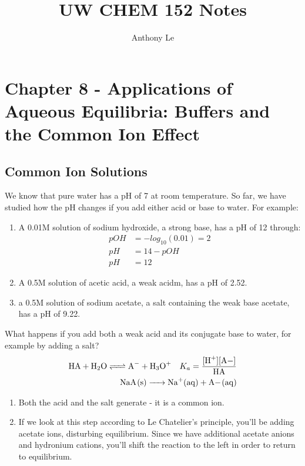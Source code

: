 \documentclass[../CHEM152Notes.tex]{subfiles}
\title{UW CHEM 152 Notes}
\author{Anthony Le}
\begin{document}
\pagestyle{fancy}
\fancyhead{}

\section*{Chapter 8 - Applications of Aqueous Equilibria: Buffers and the Common Ion Effect}

\subsection*{Common Ion Solutions}
We know that pure water has a pH of 7 at room temperature. 
So far, we have studied how the pH changes if you add either acid or base to water. For example:
\begin{enumerate}
    \item A 0.01M solution of sodium hydroxide, a strong base, has a pH of 12 through:
    \begin{equation*}
        \begin{aligned}
            pOH &= -log_{10}(0.01) = 2 \\
            pH &= 14-pOH \\
            pH &= 12
        \end{aligned}
    \end{equation*}
    \item A 0.5M solution of acetic acid, a weak acidm, has a pH of 2.52.
    \item a 0.5M solution of sodium acetate, a salt containing the weak base acetate, has a pH of 9.22.
\end{enumerate}
What happens if you add both a weak acid and its conjugate base to water, for example by adding a salt?
\begin{equation*}
    \begin{aligned}
        \ce{HA + H2O <=> A- + H3O+} \quad K_a = \ce{\frac{[H+][A-]}{HA}} \\
        \ce{NaA_(s) -> Na+_(aq) + A-_(aq)} 
    \end{aligned}
\end{equation*}
\begin{enumerate}
    \item Both the acid and the salt generate  - it is a common ion.
    \item If we look at this step according to Le Chatelier's principle, you'll be adding acetate ions, disturbing equilibrium. Since we have additional acetate anions and hydronium cations, you'll shift the reaction to the left in order to return to equilibrium.
\end{enumerate}
\end{document}
